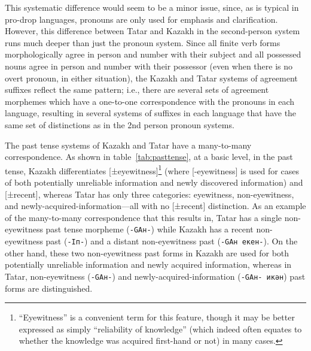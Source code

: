 \documentclass[11pt]{article}
\begin{document}
This systematic difference would seem to be a minor issue, since, as is typical in pro-drop languages, pronouns 
are only used for emphasis and clarification.  However, this difference between Tatar and Kazakh in 
the second-person system runs much deeper than just the pronoun system.  Since all finite verb forms 
morphologically agree in person and number with their subject and all possessed nouns agree in person and 
number with their possessor (even when there is no overt pronoun, in either situation), the Kazakh and Tatar 
systems of agreement suffixes reflect the same pattern; i.e., there are several sets of agreement morphemes 
which have a one-to-one correspondence with the pronouns in each language, resulting in several systems of 
suffixes in each language that have the same set of distinctions as in the 2nd person pronoun systems.

The past tense systems of Kazakh and Tatar have a many-to-many correspondence.  As shown 
in table~\ref{tab:pasttense}, at a basic level, in the past tense, Kazakh 
differentiates [±eyewitness]\footnote{``Eyewitness'' is a convenient term for this feature, though it 
may be better expressed as simply ``reliability of knowledge'' (which indeed often equates to whether the 
knowledge was acquired first-hand or not) in many cases.} (where [-eyewitness] is used for cases of both 
potentially unreliable information and newly discovered information) and [±recent], whereas Tatar has only 
three categories: eyewitness, non-eyewitness, and newly-acquired-information---all with no [±recent] distinction.  As 
an example of the many-to-many correspondence that this results in, Tatar has a single non-eyewitness 
past tense morpheme (\texttt{-GAн-}) while Kazakh has a recent non-eyewitness past (\texttt{-Iп-}) and a 
distant non-eyewitness past (\texttt{-GAн екен-}).  On the other hand, these two non-eyewitness past 
forms in Kazakh are used for both potentially unreliable information and newly acquired information, whereas 
in Tatar, non-eyewitness (\texttt{-GAн-}) and newly-acquired-information (\texttt{-GAн- икән}) past forms are distinguished.
\end{document}
